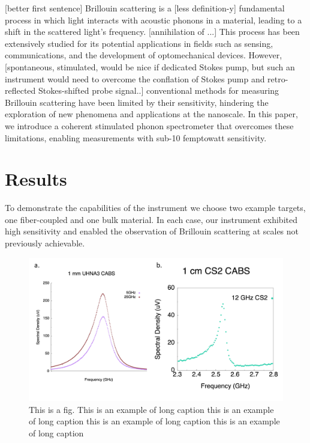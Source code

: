 \documentclass[sn-nature]{sn-jnl}%
\begin{document}
[better first sentence] Brillouin scattering is a [less definition-y] fundamental process in which light interacts with acoustic phonons in a material, leading to a shift in the scattered light's frequency. [annihilation of ...] This process has been extensively studied for its potential applications in fields such as sensing, communications, and the development of optomechanical devices. However, [spontaneous, stimulated, would be nice if dedicated Stokes pump, but such an instrument would need to overcome the conflation of Stokes pump and retro-reflected Stokes-shifted probe signal..] conventional methods for measuring Brillouin scattering have been limited by their sensitivity, hindering the exploration of new phenomena and applications at the nanoscale. In this paper, we introduce a coherent stimulated phonon spectrometer that overcomes these limitations, enabling measurements with sub-10 femptowatt sensitivity.


\section{Results}\label{Results}

To demonstrate the capabilities of the instrument we choose two example targets, one fiber-coupled and one bulk material. In each case, our instrument exhibited high sensitivity and enabled the observation of Brillouin scattering at scales not previously achievable.

\begin{figure}[t]
\centering
\includegraphics[width=\textwidth]{Observations.pdf}
\caption{This is a fig. This is an example of long caption this is an example of long caption this is an example of long caption this is an example of long caption}\label{Observations}
\end{figure}
\end{document}
